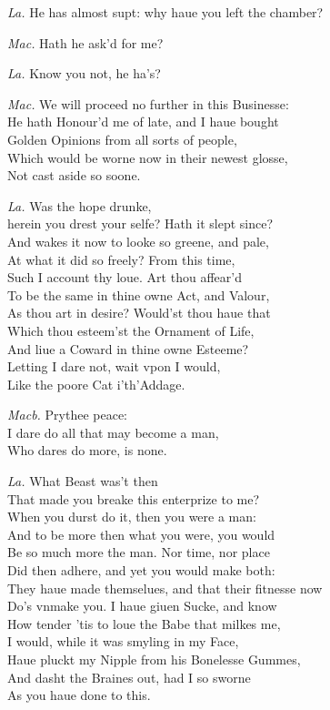 \documentclass[12pt]{sides}
\newcommand{\dia}[1]{\hskip 15pt\textit{#1}\hskip 6pt}
\begin{document}
\begin{multicols}{2}
            \dia{La.} He has almost supt: why haue you left the chamber?

            \dia{Mac.} Hath he ask'd for me?

            \dia{La.} Know you not, he ha's?

            \dia{Mac.} We will proceed no further in this Businesse: \\ He hath Honour'd me of late, and I haue bought \\ Golden Opinions from all sorts of people, \\ Which would be worne now in their newest glosse, \\ Not cast aside so soone.

            \dia{La.} Was the hope drunke, \\ herein you drest your selfe? Hath it slept since? \\ And wakes it now to looke so greene, and pale, \\ At what it did so freely? From this time, \\ Such I account thy loue. Art thou affear'd \\ To be the same in thine owne Act, and Valour, \\ As thou art in desire? Would'st thou haue that \\ Which thou esteem'st the Ornament of Life, \\ And liue a Coward in thine owne Esteeme? \\ Letting I dare not, wait vpon I would, \\ Like the poore Cat i'th'Addage.

            \dia{Macb.} Prythee peace: \\ I dare do all that may become a man, \\ Who dares do more, is none.

            \dia{La.} What Beast was't then \\ That made you breake this enterprize to me? \\ When you durst do it, then you were a man: \\ And to be more then what you were, you would \\ Be so much more the man. Nor time, nor place \\ Did then adhere, and yet you would make both: \\ They haue made themselues, and that their fitnesse now \\ Do's vnmake you. I haue giuen Sucke, and know \\ How tender 'tis to loue the Babe that milkes me, \\ I would, while it was smyling in my Face, \\ Haue pluckt my Nipple from his Bonelesse Gummes, \\ And dasht the Braines out, had I so sworne \\ As you haue done to this.


\end{multicols}
\end{document}
